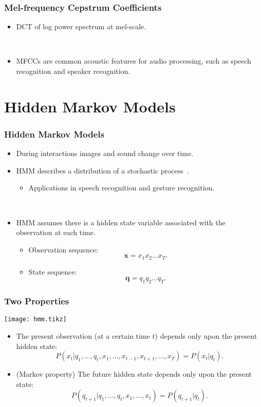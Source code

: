 \documentclass{beamer}
\begin{document}
\begin{frame}
  \frametitle{Mel-frequency Cepstrum Coefficients}

  \begin{itemize}
    \item DCT of log power spectrum at mel-scale.

      ~
    \item MFCCs are common acoustic features for audio processing, such as speech recognition and speaker recognition.
  \end{itemize}
\end{frame}

\section{Hidden Markov Models}
\begin{frame}
  \frametitle{Hidden Markov Models}

  \begin{itemize}
    \item During interactions images and sound change over time.
    \item HMM describes a distribution of a stochastic process~\cite{rabiner_fundamentals_1993}.
      \begin{itemize}
        \item Applications in speech recognition and gesture recognition. 
      \end{itemize}
      ~

    \item HMM assumes there is a hidden state variable associated with the observation at each time.
      \begin{itemize}
        \item Observation sequence: \[ \mathbf{x} = x_1 x_2 \dots x_T . \]
        \item State sequence: \[ \mathbf{q} = q_1 q_2 \dots q_T . \]
      \end{itemize}
  \end{itemize}
\end{frame}

\begin{frame}
  \frametitle{Two Properties}

  \centering
  \texttt{[image: hmm.tikz]}

  \begin{itemize}
    \item The present observation (at a certain time $t$) depends only upon the present hidden state:
      \[
        P(x_t|q_1, \dots, q_t, x_1, \dots, x_{t-1},x_{t+1},\dots,x_T) = P(x_t|q_t) .
      \]
    \item (Markov property) The future hidden state depends only upon the present state:
      \[
        P(q_{t+1}|q_1, \dots, q_t, x_1, \dots, x_t) = P(q_{t+1}|q_t) .
      \]
  \end{itemize}
\end{frame}
\end{document}
